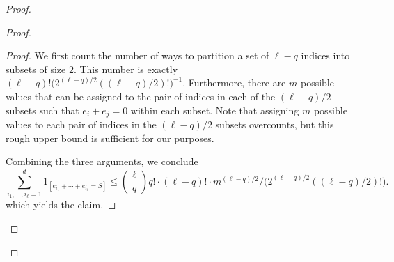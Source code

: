 \documentclass[twoside,11pt]{article}
\begin{document}
\begin{proof}
\begin{proof}
\begin{proof}
			We first count the number of ways to partition a set of $\ell-q$ indices into subsets of size $2$. This number is exactly $(\ell-q)! \Big(2^{(\ell-q)/2}((\ell-q)/2)!\Big)^{-1}$. Furthermore, there are $m$ possible values that can be assigned to the pair of indices in each of the $(\ell-q)/2$ subsets such that $e_i+e_j=0$ within each subset. Note that assigning $m$ possible values to each pair of indices in the $(\ell-q)/2$ subsets overcounts, but this rough upper bound is sufficient for our purposes. 
			
			Combining the three arguments, we conclude 
			$$
			\sum_{i_1,\ldots, i_\ell=1}^d 1_{[e_{i_1}+\cdots+e_{i_\ell}=S]}\leq  \binom{\ell}{q} q! \cdot (\ell-q)!\cdot m^{(\ell-q)/2}\Big/\Big(2^{(\ell-q)/2} ((\ell-q)/2)!\Big).
			$$
			which yields the claim.
		\end{proof}
		

\end{proof}
\end{proof}
\end{document}

